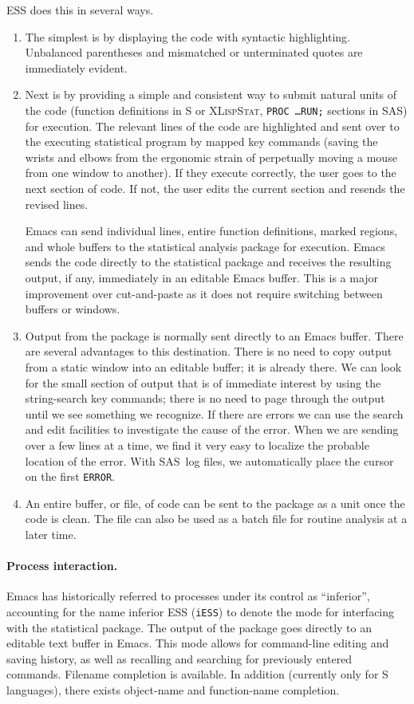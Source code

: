 \documentclass{article}
\newcommand*{\SAS}{\textsc{SAS}}
\newcommand*{\XLispStat}{\textsc{XLispStat}}
\newcommand{\stexttt}[1]{{\small\texttt{#1}}}
\begin{document}
ESS does this in several ways.
\begin{enumerate}
\item The simplest is by displaying the code with syntactic highlighting.
Unbalanced parentheses and mismatched or unterminated quotes are immediately
evident.

\item Next is by providing a simple and consistent way to submit
natural units of the code (function definitions in S or \XLispStat,
\stexttt{PROC \dots RUN;} sections in \SAS) for execution.
The relevant lines of the code are highlighted and sent over to the
executing statistical program by mapped key commands (saving the wrists
and elbows from the ergonomic strain of perpetually moving a mouse from
one window to another).  If they execute correctly, the user goes to the
next section of code.  If not, the user edits the current section and resends
the revised lines.

Emacs can send individual lines, entire function definitions, marked
regions, and whole buffers to the statistical analysis package for
execution.  Emacs sends the code directly to
the statistical package and receives the resulting output, if any,
immediately in an editable Emacs buffer.
This is a major improvement over cut-and-paste as it does
not require switching between buffers or windows.

\item
Output from the package is normally sent directly to an Emacs buffer.
There are several advantages to this destination.
There is no need to copy output from a static window into an
editable buffer; it is already there.
We can look for the
small section of output that is of immediate interest by using the
string-search key commands; there is no need to page through the
output until we see something we recognize.
If there are errors we
can use the search and edit facilities to investigate the cause of the
error.  When we are sending over a few lines at a time, we find
it very easy to localize the probable location of the error.
With \SAS\ log files, we automatically place the cursor
on the first \stexttt{ERROR}.

\item
An entire buffer, or file, of code can be sent to the package as a unit
once the code is clean.  The file can also be used as a batch file for
routine analysis at a later time.

\end{enumerate}


\paragraph{Process interaction.}
Emacs has historically referred to processes under its control as
``inferior'', accounting for the name inferior ESS (\stexttt{iESS}) to
denote the mode for interfacing with the statistical package.  The
output of the package goes directly to an editable text buffer in Emacs.
This mode allows for command-line editing and saving history, as well as
recalling and searching for previously entered commands.  Filename
completion is available.  In addition (currently only for S languages),
there exists object-name and function-name completion.
\end{document}
